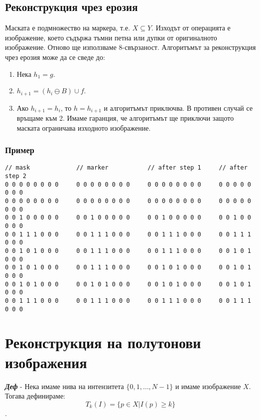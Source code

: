 \documentclass[fleqn,12pt]{article}
\begin{document}
\subsection{Реконструкция чрез ерозия}

Маската е подмножество на маркера, т.е. $X \subseteq Y$. Изходът от операцията е изображение, което съдържа тъмни петна или дупки от оригиналното изображение. Отново ще използваме 8-свързаност. Алгоритъмът за реконструкция чрез ерозия може да се сведе до:
\begin{enumerate}
    \item Нека $h_1 = g$.
    \item $h_{i+1} = (h_{i} \ominus B) \cup f$.
    \item Ако $h_{i+1} = h_i$, то $h = h_{i+1}$ и алгоритъмът приключва. В противен случай се връщаме към 2. Имаме гаранция, че алгоритъмът ще приключи защото маската ограничава изходното изображение.
\end{enumerate}

\subsubsection{Пример}

\begin{lstlisting}[caption=Example for reconstruction based on dilation]
// mask             // marker           // after step 1     // after step 2
0 0 0 0 0 0 0 0     0 0 0 0 0 0 0 0     0 0 0 0 0 0 0 0     0 0 0 0 0 0 0 0
0 0 0 0 0 0 0 0     0 0 0 0 0 0 0 0     0 0 0 0 0 0 0 0     0 0 0 0 0 0 0 0
0 0 1 0 0 0 0 0     0 0 1 0 0 0 0 0     0 0 1 0 0 0 0 0     0 0 1 0 0 0 0 0 
0 0 1 1 1 0 0 0     0 0 1 1 1 0 0 0     0 0 1 1 1 0 0 0     0 0 1 1 1 0 0 0
0 0 1 0 1 0 0 0     0 0 1 1 1 0 0 0     0 0 1 1 1 0 0 0     0 0 1 0 1 0 0 0
0 0 1 0 1 0 0 0     0 0 1 1 1 0 0 0     0 0 1 0 1 0 0 0     0 0 1 0 1 0 0 0
0 0 1 0 1 0 0 0     0 0 1 0 1 0 0 0     0 0 1 0 1 0 0 0     0 0 1 0 1 0 0 0
0 0 1 1 1 0 0 0     0 0 1 1 1 0 0 0     0 0 1 1 1 0 0 0     0 0 1 1 1 0 0 0
\end{lstlisting}

\section{Реконструкция на полутонови изображения}

\textbf{\textit{Деф}} - Нека имаме нива на интензитета $\{0, 1, \dots, N-1\}$ и имаме изображение $X$. Тогава дефинираме:
$$T_k(I) = \{p \in X | I(p) \geq k\}$$.
\end{document}
